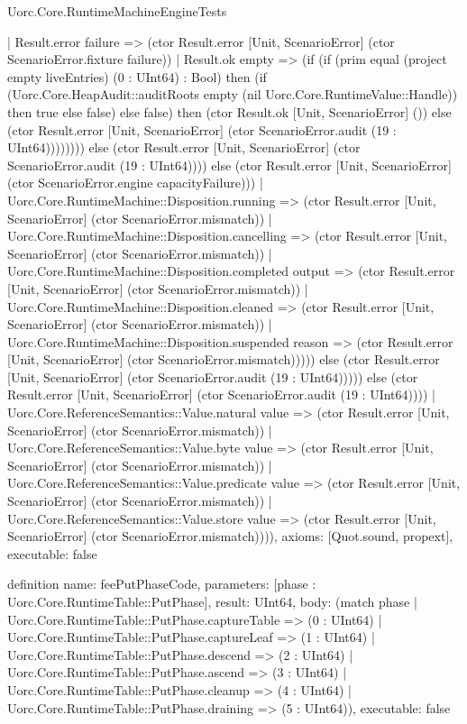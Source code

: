 \begin{lexlean}{Uorc.Core.RuntimeMachineEngineTests}
\begin{semanticmodule}
{                    | Result.error failure => (ctor Result.error [Unit, ScenarioError] (ctor ScenarioError.fixture failure))
                    | Result.ok empty => (if (if (prim equal (project empty liveEntries) (0 : UInt64) : Bool) then (if (Uorc.Core.HeapAudit::auditRoots empty (nil Uorc.Core.RuntimeValue::Handle)) then true else false) else false) then (ctor Result.ok [Unit, ScenarioError] ()) else (ctor Result.error [Unit, ScenarioError] (ctor ScenarioError.audit (19 : UInt64)))))))) else (ctor Result.error [Unit, ScenarioError] (ctor ScenarioError.audit (19 : UInt64)))) else (ctor Result.error [Unit, ScenarioError] (ctor ScenarioError.engine capacityFailure)))
              | Uorc.Core.RuntimeMachine::Disposition.running => (ctor Result.error [Unit, ScenarioError] (ctor ScenarioError.mismatch))
              | Uorc.Core.RuntimeMachine::Disposition.cancelling => (ctor Result.error [Unit, ScenarioError] (ctor ScenarioError.mismatch))
              | Uorc.Core.RuntimeMachine::Disposition.completed output => (ctor Result.error [Unit, ScenarioError] (ctor ScenarioError.mismatch))
              | Uorc.Core.RuntimeMachine::Disposition.cleaned => (ctor Result.error [Unit, ScenarioError] (ctor ScenarioError.mismatch))
              | Uorc.Core.RuntimeMachine::Disposition.suspended reason => (ctor Result.error [Unit, ScenarioError] (ctor ScenarioError.mismatch))))) else (ctor Result.error [Unit, ScenarioError] (ctor ScenarioError.audit (19 : UInt64))))) else (ctor Result.error [Unit, ScenarioError] (ctor ScenarioError.audit (19 : UInt64))))
      | Uorc.Core.ReferenceSemantics::Value.natural value => (ctor Result.error [Unit, ScenarioError] (ctor ScenarioError.mismatch))
      | Uorc.Core.ReferenceSemantics::Value.byte value => (ctor Result.error [Unit, ScenarioError] (ctor ScenarioError.mismatch))
      | Uorc.Core.ReferenceSemantics::Value.predicate value => (ctor Result.error [Unit, ScenarioError] (ctor ScenarioError.mismatch))
      | Uorc.Core.ReferenceSemantics::Value.store value => (ctor Result.error [Unit, ScenarioError] (ctor ScenarioError.mismatch)))),
  axioms: [Quot.sound, propext],
  executable: false
}

definition{
  name: feePutPhaseCode,
  parameters: [phase : Uorc.Core.RuntimeTable::PutPhase],
  result: UInt64,
  body: (match phase
    | Uorc.Core.RuntimeTable::PutPhase.captureTable => (0 : UInt64)
    | Uorc.Core.RuntimeTable::PutPhase.captureLeaf => (1 : UInt64)
    | Uorc.Core.RuntimeTable::PutPhase.descend => (2 : UInt64)
    | Uorc.Core.RuntimeTable::PutPhase.ascend => (3 : UInt64)
    | Uorc.Core.RuntimeTable::PutPhase.cleanup => (4 : UInt64)
    | Uorc.Core.RuntimeTable::PutPhase.draining => (5 : UInt64)),
  executable: false
}


\end{semanticmodule}
\end{lexlean}

